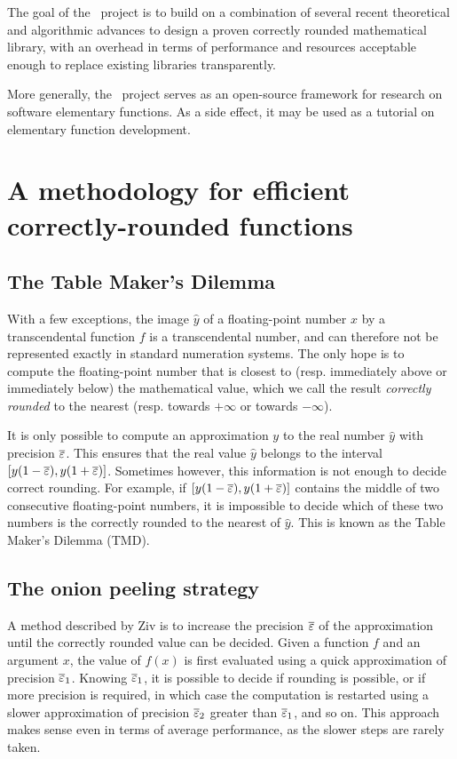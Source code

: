 The goal of the \crlibm\ project is to build on a combination of
several recent theoretical and algorithmic advances to design a proven
correctly rounded mathematical library, with an overhead  in terms of
performance and resources acceptable enough to replace existing
libraries transparently. 

More generally, the \crlibm\ project serves as an open-source
framework for research on software elementary functions. As a side
effect, it may be used as a tutorial on elementary function
development.




\section{A methodology for efficient correctly-rounded functions}
\label{section:methodology}


\subsection{The Table Maker's Dilemma}

With a few exceptions, the image $\hat{y}$ of a floating-point number $x$ by
a transcendental function $f$ is a transcendental number, and can
therefore not be represented exactly in standard numeration systems.
The only hope is to compute the floating-point number that is closest
to (resp.  immediately above or immediately below) the mathematical
value, which we call the result \emph{correctly rounded} to the
nearest (resp.  towards $+\infty$ or towards $-\infty$).

It is only possible to compute an approximation ${y}$ to the real
number $\hat{y}$ with precision ${\overline{\varepsilon}}{}$. This ensures that the real value
$\hat{y}$ belongs to the interval $[{y}(1-{\overline{\varepsilon}}{}) , {y}(1+{\overline{\varepsilon}}{})]$.
Sometimes however, this information is not enough to decide correct
rounding. For example, if $[{y}(1-{\overline{\varepsilon}}{}) , {y}(1+{\overline{\varepsilon}}{})]$
contains the middle of two consecutive floating-point numbers, it is
impossible to decide which of these two numbers is the correctly
rounded to the nearest of $\hat{y}$. This is known as the Table Maker's
Dilemma (TMD).

\subsection{The onion peeling strategy}

A method described by Ziv \cite{Ziv91} is to increase the precision
${\overline{\varepsilon}}$ of the approximation until the correctly rounded value can
be decided.  Given a function $f$ and an argument $x$, the value of
$f(x)$ is first evaluated using a quick approximation of precision
${\overline{\varepsilon}}_1$.  Knowing ${\overline{\varepsilon}}_1$, it is possible to decide if
rounding is possible, or if more precision is required, in which case
the computation is restarted using a slower approximation of precision
${\overline{\varepsilon}}_2$ greater than ${\overline{\varepsilon}}_1$, and so on. This approach makes
sense even in terms of average performance, as the slower steps are
rarely taken.

